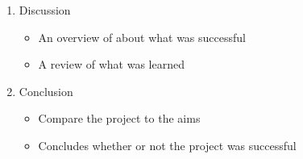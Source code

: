 \begin{enumerate}
\begin{itemize}
        \end{itemize}
    \item Discussion
        \begin{itemize}
            \item An overview of about what was successful
            \item A review of what was learned
        \end{itemize}
    \item Conclusion
        \begin{itemize}
            \item Compare the project to the aims
            \item Concludes whether or not the project was successful
        \end{itemize}
\end{enumerate}


